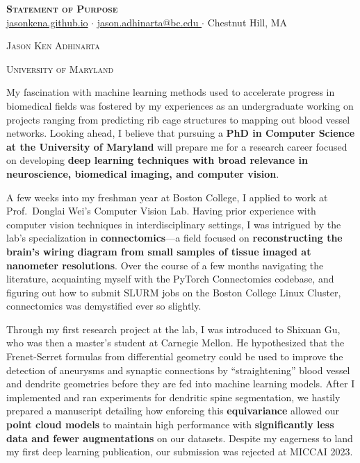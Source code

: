 \documentclass[letterpaper,11pt]{article}
\newcommand{\dualsectionold}[2]{%
  \noindent
    \parbox[b]{0.5\textwidth}{\raggedright\scshape\large #1}%
    \hfill
    \parbox[b]{0.5\textwidth}{\raggedleft\scshape\large #2}%
}
\newcommand{\dualsectionhline}{%
  \vspace{2pt}\color{black}\titlerule\vspace{-5pt}
}
\newcommand{\dualsection}[2]{%
  \dualsectionold{#1}{#2}%
  \vspace{-5pt}\dualsectionhline
}
\begin{document}
\justifying

\begin{center}
  \textbf{\Huge \scshape Statement of Purpose} \\ \vspace{3pt}
    \small
    \href{https://jasonkena.github.io}{jasonkena.github.io}
   \hspace{0.05cm}$\cdot$\hspace{0.05cm}
    \href{mailto:jason.adhinarta@bc.edu}{ jason.adhinarta@bc.edu }
   \hspace{0.05cm}$\cdot$\hspace{0.05cm}
    Chestnut Hill, MA
\end{center}


\dualsection{Jason Ken Adhinarta}{University of Maryland}
\vspace{2pt}\color{black}\titlerule%

My fascination with machine learning methods used to accelerate progress in biomedical fields was fostered by my experiences as an undergraduate working on projects ranging from predicting rib cage structures to mapping out blood vessel networks. Looking ahead, I believe that pursuing a \textbf{PhD in Computer Science at the University of Maryland} will prepare me for a research career focused on developing \textbf{deep learning techniques with broad relevance in neuroscience, biomedical imaging, and computer vision}.

A few weeks into my freshman year at Boston College, I applied to work at Prof.\ Donglai Wei’s Computer Vision Lab. Having prior experience with computer vision techniques in interdisciplinary settings, I was intrigued by the lab’s specialization in \textbf{connectomics}---a field focused on \textbf{reconstructing the brain’s wiring diagram from small samples of tissue imaged at nanometer resolutions}. Over the course of a few months navigating the literature, acquainting myself with the PyTorch Connectomics codebase, and figuring out how to submit SLURM jobs on the Boston College Linux Cluster, connectomics was demystified ever so slightly.

Through my first research project at the lab, I was introduced to Shixuan Gu, who was then a master’s student at Carnegie Mellon. He hypothesized that the Frenet-Serret formulas from differential geometry could be used to improve the detection of aneurysms and synaptic connections by “straightening” blood vessel and dendrite geometries before they are fed into machine learning models. After I implemented and ran experiments for dendritic spine segmentation, we hastily prepared a manuscript detailing how enforcing this \textbf{equivariance} allowed our \textbf{point cloud models} to maintain high performance with \textbf{significantly less data and fewer augmentations} on our datasets. Despite my eagerness to land my first deep learning publication, our submission was rejected at MICCAI 2023.
\end{document}
